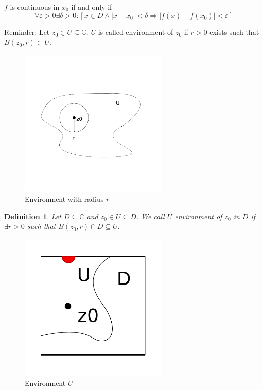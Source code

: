 \documentclass[a4paper,landscape,twocolumn]{article}
\newtheorem{defi}{Definition}
\newcommand\abs[1]{\left|#1\right|}
\begin{document}
$f$ is continuous in $x_0$ if and only if
\[
  \forall \varepsilon > 0 \exists \delta > 0:
  [x \in D \land \abs{x - x_0} < \delta \Rightarrow \abs{f(x) - f(x_0)} < \varepsilon]
\]

Reminder:
Let $z_0 \in U \subseteq \mathbb C$.
$U$ is called environment of $z_0$ if $r > 0$ exists such that $B(z_0, r) \subset U$.

\begin{figure}[!h]
  \begin{center}
    \includegraphics[width=200pt]{img/environment.pdf}
    \caption{Environment with radius $r$}
  \end{center}
\end{figure}

\begin{defi}
  Let $D \subseteq \mathbb C$ and $z_0 \in U \subseteq D$.
  We call $U$ \emph{environment} of $z_0$ \emph{in} $D$ if $\exists r > 0$
  such that $B(z_0, r) \cap D \subseteq U$.
\end{defi}

\begin{figure}[!h]
  \begin{center}
    \includegraphics[width=200pt]{img/environment_D_and_U.pdf}
    \caption{Environment $U$}
  \end{center}
\end{figure}
\end{document}
